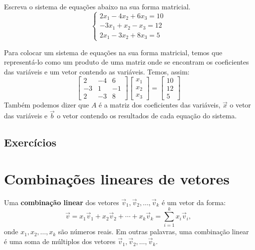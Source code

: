 \begin{exeresol}
Escreva o sistema de equações abaixo na sua forma matricial.
\begin{equation}
 \left\{
  \begin{array}{ll}
    2x_1 - 4x_2 + 6x_3 = 10 \\
    -3x_1 + x_2 - x_3 = 12 \\
    2x_1 - 3x_2 + 8x_3 = 5
  \end{array}\right.
\end{equation}
\end{exeresol}
\begin{resol}
Para colocar um sistema de equações na sua forma matricial, temos que representá-lo como um produto de uma matriz onde se encontram os coeficientes das variáveis e um vetor contendo as variáveis. Temos, assim:
\begin{equation}
 \left[
  \begin{array}{ccc}
    2 & -4 & 6  \\
    -3 & 1 & -1  \\
    2 & -3 & 8
  \end{array}
\right]
\left[
  \begin{array}{c}
   x_1 \\
   x_2 \\
   x_3 
  \end{array}
  \right] = 
\left[
  \begin{array}{c}
   10 \\
   12 \\
   5
  \end{array}
\right]
\end{equation}
Também podemos dizer que $A$ é a matriz dos coeficientes das variáveis, $\vec{x}$ o vetor das variáveis e $\vec{b}$ o vetor contendo os resultados de cada equação do sistema.
\end{resol}


\subsection*{Exercícios}

\construirExer


\section{Combinações lineares de vetores}

Uma \textbf{combinação linear} dos vetores $\vec{v}_1, \vec{v}_2, \dots, \vec{v}_k$ é um vetor da forma:
\begin{equation}
\vec{v} = x_1 \vec{v}_1 + x_2 \vec{v}_2 + \cdots + x_k \vec{v}_k = \sum_{i=1}^k x_i \vec{v}_i,
\end{equation} onde $x_1, x_2, \dots, x_k$ são números reais. Em outras palavras, uma combinação linear é uma soma de múltiplos dos vetores $\vec{v}_1, \vec{v}_2, \dots, \vec{v}_k$.


